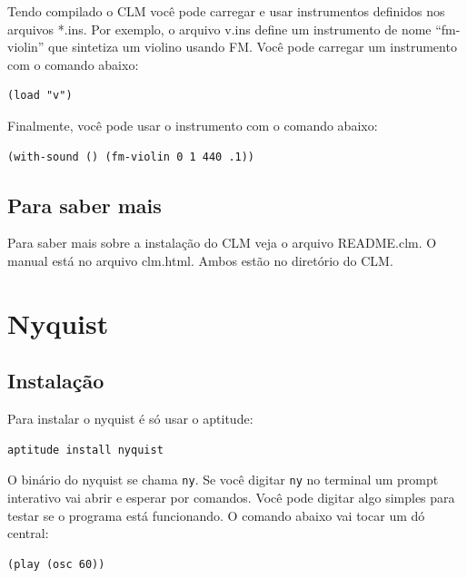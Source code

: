 \documentclass[12pt,brazil]{book}
\begin{document}
Tendo compilado o CLM você pode carregar e usar instrumentos definidos
nos arquivos *.ins. Por exemplo, o arquivo v.ins define um instrumento
de nome ``fm-violin'' que sintetiza um violino usando FM. Você pode
carregar um instrumento com o comando abaixo:

\begin{verbatim}
(load "v")
\end{verbatim}

Finalmente, você pode usar o instrumento com o comando abaixo:

\begin{verbatim}
(with-sound () (fm-violin 0 1 440 .1)) 
\end{verbatim}

\section{Para saber mais}
\label{sec:para-saber-mais}

Para saber mais sobre a instalação do CLM veja o arquivo README.clm.
O manual está no arquivo clm.html. Ambos estão no diretório do CLM.

\chapter{Nyquist}
\label{cha:nyquist}

\section{Instalação}
\label{sec:instalacao-1}

Para instalar o nyquist é só usar o aptitude:

\begin{verbatim}
aptitude install nyquist
\end{verbatim}

O binário do nyquist se chama \texttt{ny}. Se você digitar \texttt{ny}
no terminal um prompt interativo vai abrir e esperar por comandos.
Você pode digitar algo simples para testar se o programa está
funcionando. O comando abaixo vai tocar um dó central:

\begin{verbatim}
(play (osc 60))
\end{verbatim}
\end{document}
